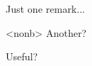\begin{tdocrem}
    Just one remark...
\end{tdocrem}

\begin{tdocrem}<nonb>
    Another?
\end{tdocrem}

\begin{tdocrem}
    Useful?
\end{tdocrem}
